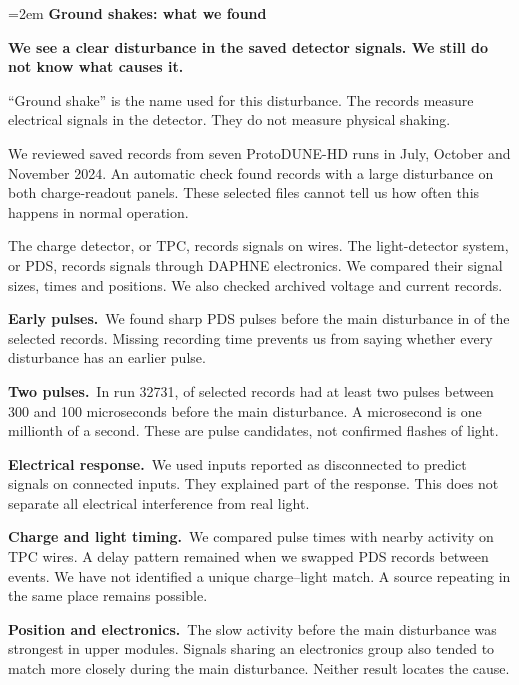 \documentclass[12pt,a4paper]{article}
\newcommand{\heading}[1]{\par\vspace{6pt}{\large\bfseries #1}\par}
\newcommand{\finding}[2]{\textbf{#1}\ #2\par}
\begin{document}
\raggedright
{}
\emergencystretch=2em
{\LARGE\bfseries Ground shakes: what we found}\par
\textbf{We see a clear disturbance in the saved detector signals. We still do not know what causes it.}

``Ground shake'' is the name used for this disturbance. The records measure
electrical signals in the detector. They do not measure physical shaking.

\heading{The records we checked}
We reviewed \records{} saved records from seven ProtoDUNE-HD runs in July,
October and November 2024. An automatic check found \candidates{} records with
a large disturbance on both charge-readout panels.
These selected files cannot tell us how often this happens in normal operation.

The charge detector, or TPC, records signals on wires. The light-detector
system, or PDS, records signals through DAPHNE electronics. We compared their
signal sizes, times and positions. We also checked archived voltage and current records.

\heading{The checks and what they tell us}
\finding{Early pulses.}{We found sharp PDS pulses before the main disturbance in
\early{} of the \candidates{} selected records. Missing recording time prevents
us from saying whether every disturbance has an earlier pulse.}

\finding{Two pulses.}{In run 32731, \doubleRecords{} of \doubleTotal{} selected records
had at least two pulses between 300 and 100 microseconds before the main disturbance.
A microsecond is one millionth of a second. These are pulse candidates, not confirmed flashes of light.}

\finding{Electrical response.}{We used inputs reported as disconnected to predict
signals on connected inputs. They explained part of the response. This does not
separate all electrical interference from real light.}

\finding{Charge and light timing.}{We compared pulse times with nearby activity on
TPC wires. A delay pattern remained when we swapped PDS records between events.
We have not identified a unique charge--light match. A source repeating in the same place remains possible.}

\finding{Position and electronics.}{The slow activity before the main disturbance
was strongest in upper modules. Signals sharing an electronics group also tended
to match more closely during the main disturbance. Neither result locates the cause.}
\end{document}
